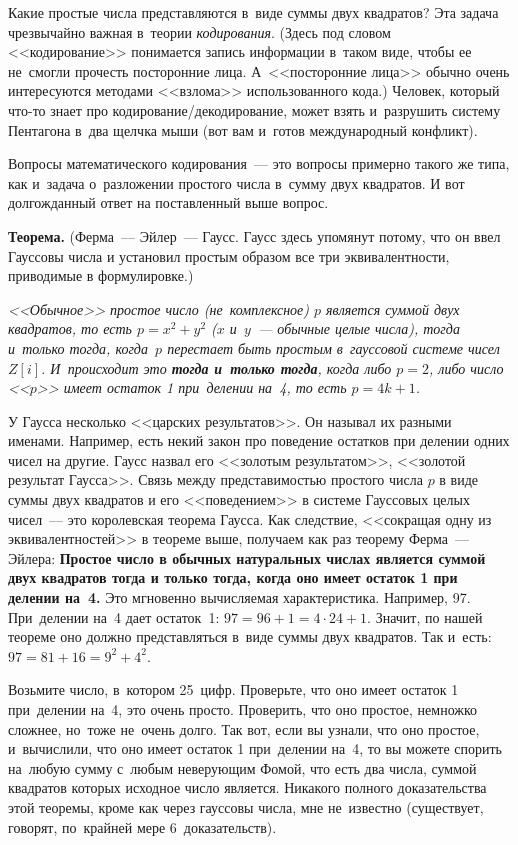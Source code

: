 Какие простые числа представляются в~виде суммы двух квадратов? Эта задача чрезвычайно важная
в~теории \textit{кодирования}. (Здесь под словом <<кодирование>> понимается запись информации
в~таком виде, чтобы ее не~смогли прочесть посторонние лица. А~<<посторонние лица>> обычно очень
интересуются методами <<взлома>> использованного кода.) Человек, который что-то знает про
кодирование/декодирование, может взять и~разрушить систему Пентагона в~два щелчка мыши
(вот вам и~готов международный конфликт).

Вопросы математического кодирования~--- это вопросы примерно такого же типа, как
и~задача о~разложении простого числа в~сумму двух квадратов. И вот долгожданный
ответ на поставленный выше вопрос.



\smallskip

{\bf Теорема.} (Ферма~--- Эйлер~--- Гаусс. Гаусс здесь упомянут потому, что он ввел Гауссовы
числа и установил простым образом все три эквивалентности, приводимые в формулировке.)


\textit{<<Обычное>> простое число (не~комплексное) $p$ является суммой двух квадратов, то есть
$p=x^{2}+y^{2}$ ($x$ и~$y$~--- обычные целые числа), тогда и~только тогда, когда~$p$
перестает быть простым в~гауссовой системе чисел~$Z[i]$.
И~происходит это \textbf{тогда и~только тогда}, когда либо $p=2$, либо число <<$p$>> имеет остаток 1 при~делении на~4, то есть $p=4k+1$.}

\smallskip

У Гаусса несколько <<царских результатов>>. Он называл их разными именами. Например, есть некий
закон про поведение остатков при делении одних чисел на другие. Гаусс назвал его <<золотым
результатом>>, <<золотой результат Гаусса>>. Связь между представимостью простого числа $p$ в виде
суммы двух квадратов и его <<поведением>> в системе Гауссовых целых чисел~--- это королевская
теорема Гаусса. Как следствие, <<сокращая одну из эквивалентностей>> в теореме выше, получаем как
раз теорему Ферма~--- Эйлера: {\bf Простое число в обычных натуральных числах является суммой двух
квадратов тогда и только тогда, когда оно имеет остаток 1 при делении на~4.}
Это мгновенно
вычисляемая характеристика. Например, 97. При~делении на~4 дает остаток~1: $97=96+1=4\cdot24+1$.
Значит, по нашей теореме оно должно представляться в~виде суммы двух квадратов. Так и~есть:
$97=81+16=9^{2}+4^{2}$.

Возьмите число, в~котором 25~цифр. Проверьте, что оно имеет остаток 1
при~делении на~4, это очень просто.
 Проверить, что оно простое, немножко сложнее, но~тоже не~очень
долго. Так вот, если вы узнали, что оно простое, и~вычислили, что оно имеет остаток 1 при~делении
на~4, то вы можете спорить на~любую сумму с~любым неверующим Фомой, что есть два числа, суммой
квадратов которых исходное число является. Никакого полного доказательства этой теоремы, кроме как
через гауссовы числа, мне не~известно (существует, говорят, по~крайней мере 6~доказательств).

